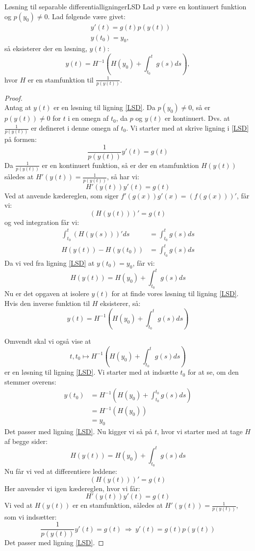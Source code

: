 \begin{mytheo}{Løsning til separable differentialligninger}{LSD}
Lad $p$ være en kontinuert funktion og $p(y_0) \neq 0$. Lad følgende være givet:
\begin{equation}\label{LSD}
    \begin{aligned}
    &y'(t)=g(t)p(y(t))\\ 
    &y(t_0)=y_0,
    \end{aligned}
\end{equation}
så eksisterer der en løsning, $y(t)$:
$$y(t)=H^{-1} \left ( H(y_0)+\int_{t_0}^tg(s)ds \right ),$$
hvor $H$ er en stamfunktion til $\frac{1}{p(y(t))}$.
\end{mytheo}

\begin{proof}\\
Antag at $y(t)$ er en løsning til ligning \eqref{LSD}.
\hfill \break
Da $p(y_0) \neq 0$, så er $p(y(t)) \neq 0$ for $t$ i en omegn af $t_0$, da $p$ og $y(t)$ er kontinuert. Dvs. at $\frac{1}{p(y(t))}$ er defineret i denne omegn af $t_0$.
\hfill \break
Vi starter med at skrive ligning i \eqref{LSD} på formen:
\begin{equation*}
    \frac{1}{p(y(t))}y'(t)= g(t)
\end{equation*}
Da $\frac{1}{p(y(t))}$ er en kontinuert funktion, så er der en stamfunktion $H(y(t))$ således at $H'(y(t))=\frac{1}{p(y(t))}$, så har vi: 
$$H'(y(t)) y'(t)=g(t)$$
Ved at anvende kædereglen, som siger $f'(g(x))g'(x)=(f(g(x)))'$, får vi:
$$(H(y(t)))'=g(t)$$
og ved integration får vi:
\begin{align*}
    \int_{t_0}^t(H(y(s)))'ds&=\int_{t_0}^tg(s)ds\\
    H(y(t))-H(y(t_0))&=\int_{t_0}^tg(s)ds
\end{align*}
Da vi ved fra ligning \eqref{LSD} at $y(t_0)=y_0$, får vi:
$$H(y(t))=H(y_0)+\int_{t_0}^tg(s)ds$$
Nu er det opgaven at isolere $y(t)$ for at finde vores løsning til ligning \eqref{LSD}.
Hvis den inverse funktion til $H$ eksisterer, så:
$$y(t)=H^{-1} \left ( H(y_0)+\int_{t_0}^tg(s)ds \right )$$

Omvendt skal vi også vise at
$$t,t_0 \mapsto H^{-1} \left ( H(y_0)+\int_{t_0}^tg(s)ds \right ) $$ er en løsning til ligning \eqref{LSD}.
Vi starter med at indsætte $t_0$ for at se, om den stemmer overens: 
\begin{align*}
    y(t_0)&=H^{-1} \left ( H(y_0)+\int_{t_0}^{t_0}g(s)ds \right )\\
    &=H^{-1} (H(y_0))\\
    &=y_0
\end{align*}
Det passer med ligning \eqref{LSD}. Nu kigger vi så på $t$, hvor vi starter med at tage $H$ af begge sider:
$$H(y(t))=H(y_0)+\int_{t_0}^tg(s)ds$$
Nu får vi ved at differentiere leddene:
$$(H(y(t)))'=g(t)$$
Her anvender vi igen kædereglen, hvor vi får:
$$H'(y(t)) y'(t)=g(t)$$
Vi ved at $H(y(t))$ er en stamfunktion, således at $H'(y(t))=\frac{1}{p(y(t))}$, som vi indsætter:
$$\frac{1}{p(y(t))}y'(t)=g(t) \ \Rightarrow \ y'(t)=g(t)p(y(t))$$
Det passer med ligning \eqref{LSD}.
\end{proof}\\

